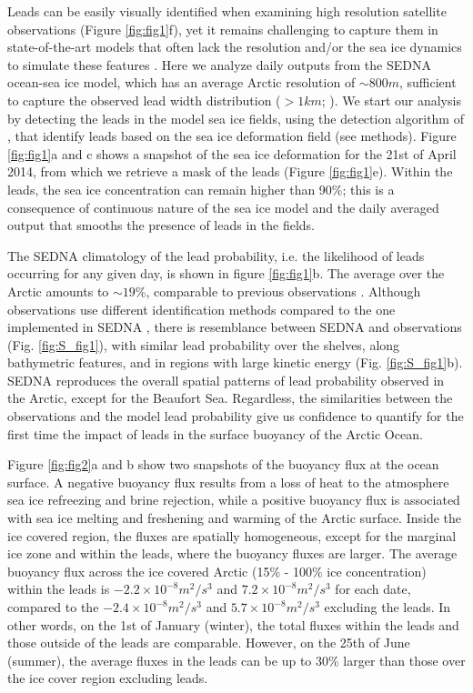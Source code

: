 \documentclass[lineno,sn-basic]{sn-jnl}%
\begin{document}
Leads can be easily visually identified when examining high resolution satellite observations (Figure \ref{fig:fig1}f), yet it remains challenging to capture them in state-of-the-art models that often lack the resolution and/or the sea ice dynamics to simulate these features \citep{Bouchat_sea_ice_rheology_2022, Wang_leads_2016}. Here we analyze daily outputs from the SEDNA ocean-sea ice model, which has an average Arctic resolution of $\sim 800m$, sufficient to capture the observed lead width distribution ($>1km$; \citealp{Wernecke_Lead_2015}). 
We start our analysis by detecting the leads in the model sea ice fields, using the detection algorithm of \citet{Hutter_identification_2019}, that identify leads based on the sea ice deformation field (see methods). Figure \ref{fig:fig1}a and c shows a snapshot of the sea ice deformation for the 21st of April 2014, from which we retrieve a mask of the leads (Figure \ref{fig:fig1}e). Within the leads, the sea ice concentration can remain higher than 90\%; this is a consequence of continuous nature of the sea ice model and the daily averaged output that smooths the presence of leads in the fields.

The SEDNA climatology of the lead probability, i.e. the likelihood of leads occurring for any given day, is shown in figure \ref{fig:fig1}b. The average over the Arctic amounts to $\sim 19\%$, comparable to previous observations \citep{Wernecke_Lead_2015,Willmes_leads_currents_2023}. Although observations use different identification methods compared to the one implemented in SEDNA \citep{Hutter_identification_2019}, there is resemblance between SEDNA and observations (Fig. \ref{fig:S_fig1}), with similar lead probability over the shelves, along bathymetric features, and in regions with large kinetic energy (Fig. \ref{fig:S_fig1}b). SEDNA reproduces the overall spatial patterns of lead probability observed in the Arctic, except for the Beaufort Sea. Regardless, the similarities between the observations and the model lead probability give us confidence to quantify for the first time the impact of leads in the surface buoyancy of the Arctic Ocean.

Figure \ref{fig:fig2}a and b show two snapshots of the buoyancy flux at the ocean surface. A negative buoyancy flux results from a loss of heat to the atmosphere sea ice refreezing and brine rejection, while a positive buoyancy flux is associated with sea ice melting and freshening and warming of the Arctic surface. Inside the ice covered region, the fluxes are spatially homogeneous, except for the marginal ice zone and within the leads, where the buoyancy fluxes are larger. The average buoyancy flux across the ice covered Arctic (15\% - 100\% ice concentration) within the leads is $-2.2\times 10^{-8} m^2/s^3$ and $7.2\times 10^{-8} m^2/s^3$ for each date, compared to the $-2.4\times 10^{-8} m^2/s^3$ and $5.7\times 10^{-8} m^2/s^3$ excluding the leads. In other words, on the 1st of January (winter), the total fluxes within the leads and those outside of the leads are comparable. However, on the 25th of June (summer), the average fluxes in the leads can be up to 30\% larger than those over the ice cover region excluding leads.
\end{document}

